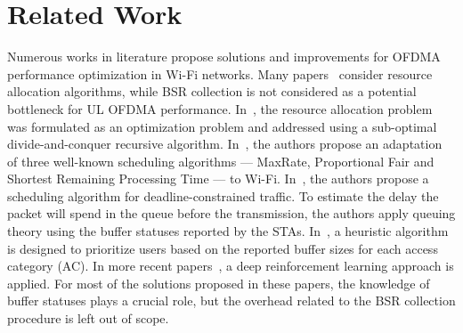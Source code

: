 \section{Related Work}
\label{related_works}

Numerous works in literature propose solutions and improvements for OFDMA
performance optimization in Wi-Fi networks. Many papers~\cite{1_Wang, 1_Bankov,
1_Inamullah, 1_Qadri, noh2024joint, tan2024deep} consider resource allocation
algorithms, while BSR collection is not considered as a potential bottleneck for
UL OFDMA performance. In~\cite{1_Wang}, the resource allocation problem was
formulated as an optimization problem and addressed using a sub-optimal
divide-and-conquer recursive algorithm. In~\cite{1_Bankov}, the authors propose
an adaptation of three well-known scheduling algorithms --- MaxRate, Proportional
Fair and Shortest Remaining Processing Time --- to Wi-Fi. In~\cite{1_Inamullah},
the authors propose a scheduling algorithm for deadline-constrained traffic. To
estimate the delay the packet will spend in the queue before the transmission,
the authors apply queuing theory using the buffer statuses reported by the
STAs. In~\cite{1_Qadri}, a heuristic algorithm is designed to prioritize users
based on the reported buffer sizes for each access category (AC). In more recent
papers~\cite{noh2024joint, tan2024deep}, a deep reinforcement learning approach
is applied. For most of the solutions proposed in these papers, the knowledge
of buffer statuses plays a crucial role, but the overhead related to the BSR
collection procedure is left out of scope.

